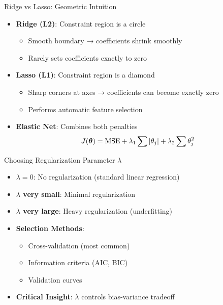 \documentclass{beamer}
\begin{document}
\begin{frame}{Ridge vs Lasso: Geometric Intuition}
\begin{itemize}[<+->]
\item \textbf{Ridge (L2)}: Constraint region is a circle
    \begin{itemize}
    \item Smooth boundary → coefficients shrink smoothly
    \item Rarely sets coefficients exactly to zero
    \end{itemize}
\item \textbf{Lasso (L1)}: Constraint region is a diamond
    \begin{itemize}
    \item Sharp corners at axes → coefficients can become exactly zero
    \item Performs automatic feature selection
    \end{itemize}
\item \textbf{Elastic Net}: Combines both penalties
    $$J(\boldsymbol{\theta}) = \text{MSE} + \lambda_1\sum|\theta_j| + \lambda_2\sum\theta_j^2$$
\end{itemize}
\end{frame}

\begin{frame}{Choosing Regularization Parameter $\lambda$}
\begin{itemize}[<+->]
\item \textbf{$\lambda = 0$}: No regularization (standard linear regression)
\item \textbf{$\lambda$ very small}: Minimal regularization
\item \textbf{$\lambda$ very large}: Heavy regularization (underfitting)
\item \textbf{Selection Methods}:
    \begin{itemize}
    \item Cross-validation (most common)
    \item Information criteria (AIC, BIC)
    \item Validation curves
    \end{itemize}
\item \textbf{Critical Insight}: $\lambda$ controls bias-variance tradeoff
\end{itemize}
\end{frame}
\end{document}
